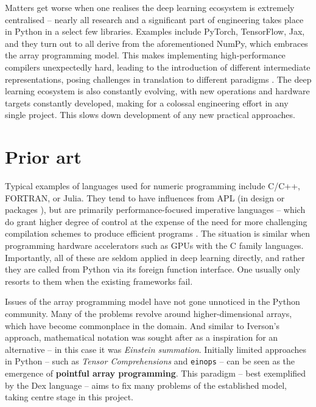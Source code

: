 Matters get worse when one realises the deep learning ecosystem is extremely centralised -- nearly all research and a significant part of engineering takes place in Python in a select few libraries. Examples include PyTorch, TensorFlow, Jax, and they turn out to all derive from the aforementioned NumPy, which embraces the array programming model. 
This makes implementing high-performance compilers unexpectedly hard, leading to the introduction of different intermediate representations, posing challenges in translation to different paradigms \cite{feng2023tensorir}. The deep learning ecosystem is also constantly evolving, with new operations and hardware targets constantly developed, making for a colossal engineering effort in any single project. This slows down development of any new practical approaches.

\section{Prior art}

Typical examples of languages used for numeric programming include C/C++, FORTRAN, or Julia. They tend to have influences from APL (in design \cite{bernecky1991fortran} or packages \cite{eigenweb}), but are primarily performance-focused imperative languages -- which do grant higher degree of control at the expense of the need for more challenging compilation schemes to produce efficient programs \cite{grosser2012polly}. The situation is similar when programming hardware accelerators such as GPUs with the C family languages. Importantly, all of these are seldom applied in deep learning directly, and rather they are called from Python via its foreign function interface. One usually only resorts to them when the existing frameworks fail.

Issues of the array programming model have not gone unnoticed in the Python community. Many of the problems revolve around higher-dimensional arrays, which have become commonplace in the domain. And similar to Iverson's approach, mathematical notation was sought after as a inspiration for an alternative -- in this case it was \textit{Einstein summation}. Initially limited approaches in Python -- such as \textit{Tensor Comprehensions} \cite{vasilache2018tensor} and \texttt{einops} \cite{rogozhnikov2021einops} -- can be seen as the emergence of \textbf{pointful array programming}. This paradigm -- best exemplified by the Dex language \cite{paszke2021getting} -- aims to fix many problems of the established model, taking centre stage in this project. 

